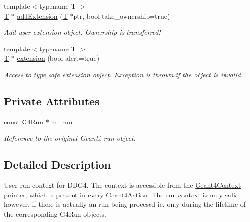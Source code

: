 \begin{DoxyCompactItemize}
{\footnotesize template$<$typename T $>$ }\\\hyperlink{class_t}{T} $\ast$ \hyperlink{class_d_d4hep_1_1_simulation_1_1_geant4_run_a424d56711e2ba1837617834a1c1b0106}{addExtension} (\hyperlink{class_t}{T} $\ast$ptr, bool take\_\-ownership=true)
\begin{DoxyCompactList}\small\item\em Add user extension object. Ownership is transferred! \item\end{DoxyCompactList}\item 
{\footnotesize template$<$typename T $>$ }\\\hyperlink{class_t}{T} $\ast$ \hyperlink{class_d_d4hep_1_1_simulation_1_1_geant4_run_aa6fa87e154a0a4f2f550b2d15a457c49}{extension} (bool alert=true)
\begin{DoxyCompactList}\small\item\em Access to type safe extension object. Exception is thrown if the object is invalid. \item\end{DoxyCompactList}\end{DoxyCompactItemize}
\subsection*{Private Attributes}
\begin{DoxyCompactItemize}
\item 
const G4Run $\ast$ \hyperlink{class_d_d4hep_1_1_simulation_1_1_geant4_run_a9749412423798b1b248adc8c85acbcc1}{m\_\-run}
\begin{DoxyCompactList}\small\item\em Reference to the original Geant4 run object. \item\end{DoxyCompactList}\end{DoxyCompactItemize}


\subsection{Detailed Description}
User run context for DDG4. The context is accessible from the \hyperlink{class_d_d4hep_1_1_simulation_1_1_geant4_context}{Geant4Context} pointer, which is present in every \hyperlink{class_d_d4hep_1_1_simulation_1_1_geant4_action}{Geant4Action}. The run context is only valid however, if there is actually an run being procesed ie. only during the lifetime of the corresponding G4Run objects.

